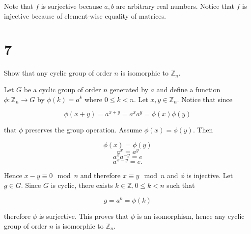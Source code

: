 \documentclass[a4paper]{article}
\begin{document}
Note that $f$ is surjective because $a,b$ are arbitrary real numbers. Notice that $f$ is injective because of element-wise equality of matrices.


\section*{7}

Show that any cyclic group of order $n$ is isomorphic to $\mathbb{Z}_n$.

\vspace{\baselineskip}

Let $G$ be a cyclic group of order $n$ generated by $a$ and define a function $\phi : \mathbb{Z}_n \rightarrow G$ by $\phi(k) = a^k$ where $0 \leq k < n$. Let $x,y \in \mathbb{Z}_n$. 
Notice that since

$$\phi(x + y) = a^{x+y} = a^x a^y = \phi(x) \phi(y)$$

that $\phi$ preserves the group operation. Assume $\phi(x) = \phi(y)$. Then

$$\phi(x) = \phi(y)$$
$$a^x = a^y$$
$$a^x a^{-y} = e$$
$$a^{x-y} = e.$$

Hence $x - y \equiv 0 \mod n$ and therefore $x \equiv y \mod n$ and $\phi$ is injective. Let $g \in G$. Since $G$ is cyclic, there exists $k \in \mathbb{Z}, 0 \leq k < n$ such that

$$g = a^k = \phi(k)$$

therefore $\phi$ is surjective. This proves that $\phi$ is an isomorphism, hence any cyclic group of order $n$ is isomorphic to $\mathbb{Z}_n$.
\end{document}
